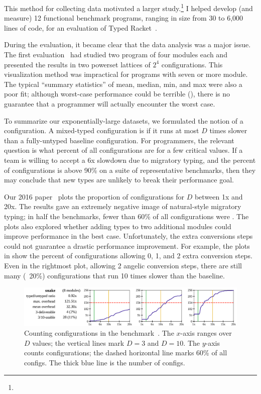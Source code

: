 This method for collecting data motivated a larger study.\footnote{}
I helped develop (and measure) 12 functional benchmark programs, ranging in
 size from 30 to 6,000 lines of code, for an evaluation of Typed
 Racket~\cite{tfgnvf-popl-2016}.

During the evaluation, it became clear that the data analysis was a major
 issue.
The first evaluation~\cite{tfdfftf-ecoop-2015} had studied two program of four modules each
 and presented the results in two powerset lattices of $2^4$ configurations.
This visualization method was impractical for programs with seven or more
 module.
The typical ``summary statistics'' of mean, median, min, and max were also a
 poor fit; although worst-case performance could be terrible
 (), there is no guarantee that a programmer
 will actually encounter the worst case.

To summarize our exponentially-large datasets, we formulated the notion
 of a  configuration.
A mixed-typed configuration is  if it runs at most $D$ times
 slower than a fully-untyped baseline configuration.
For programmers, the relevant question is what percent of all configurations
 are  for a few critical values.
If a team is willing to accept a 6x slowdown due to migratory typing,
 and the percent of  configurations is above 90\% on a suite
 of representative benchmarks, then they may conclude that new types are
 unlikely to break their performance goal.

Our 2016 paper~\cite{tfgnvf-popl-2016} plots the proportion of
  configurations for $D$ between 1x and 20x.
The results gave an extremely negative image of natural-style migratory typing;
 in half the benchmarks, fewer than 60\% of all configurations were
 .
The plots also explored whether adding types to two additional modules could
 improve performance in the best case.
Unfortunately, the extra conversions steps could not guarantee a drastic
 performance improvement.
For example, the plots in  show the percent of
  configurations allowing 0, 1, and 2 extra conversion steps.
Even in the rightmost plot, allowing 2 angelic conversion steps, there are
 still many (~20\%) configurations that run 10 times slower than the baseline.

\begin{figure}[h]
\includegraphics[width=0.96\columnwidth]{src/snake-popl.png}
\caption{Counting  configurations in the 
         benchmark~\cite{tfgnvf-popl-2016}. The $x$-axis ranges over $D$ values;
         the vertical lines mark $D=3$ and $D=10$.
         The $y$-axis counts configurations; the dashed horizontal line marks
         $60$\% of all configs.
         The thick blue line is the number of  configs.}
\label{fig:snake-popl}
\end{figure}



